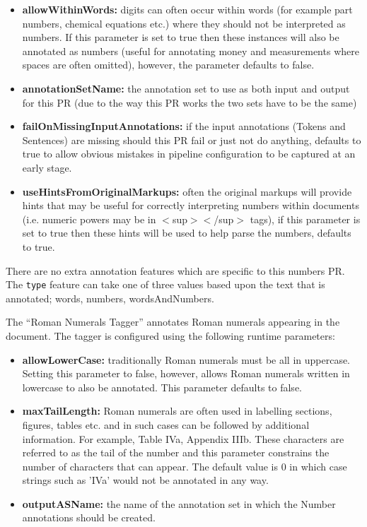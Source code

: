 \begin{itemize}
\item \textbf{allowWithinWords:} digits can often occur within words (for
  example part numbers, chemical equations etc.) where they should not be
  interpreted as numbers. If this parameter is set to true then these instances
  will also be annotated as numbers (useful for annotating money and
  measurements where spaces are often omitted), however, the parameter defaults
  to false.
\item \textbf{annotationSetName:} the annotation set to use as both input and
  output for this PR (due to the way this PR works the two sets have to be the
  same)
\item \textbf{failOnMissingInputAnnotations:} if the input annotations (Tokens
  and Sentences) are missing should this PR fail or just not do anything,
  defaults to true to allow  obvious mistakes in pipeline configuration to be
  captured at an early stage.
\item \textbf{useHintsFromOriginalMarkups:} often the original markups will
  provide hints that may be useful for correctly interpreting numbers within
  documents  (i.e. numeric powers may be in $<$sup$><$/sup$>$ tags), if this
  parameter is set to true then these hints will be used to help parse the
  numbers, defaults to true.
\end{itemize}

There are no extra annotation features which are specific to this numbers PR.
The \texttt{type} feature can take one of three values based upon the text that
is annotated; words, numbers, wordsAndNumbers.


The ``Roman Numerals Tagger'' annotates Roman numerals appearing in the document. The tagger is configured using the following runtime parameters:

\begin{itemize}
\item \textbf{allowLowerCase:} traditionally Roman numerals must be all in uppercase. Setting this parameter to false, however, allows Roman numerals written in lowercase
  to also be annotated. This parameter defaults to false.
\item \textbf{maxTailLength:} Roman numerals are often used in labelling sections, figures, tables etc. and in such cases can be followed by additional information. For
  example, Table IVa, Appendix IIIb. These characters are referred to as the tail of the number and this parameter constrains the number of characters that can appear. The default value is 0 in which case strings such as 'IVa' would not be annotated in any way.
\item \textbf{outputASName:} the name of the annotation set in which the Number annotations should be created.
\end{itemize}

